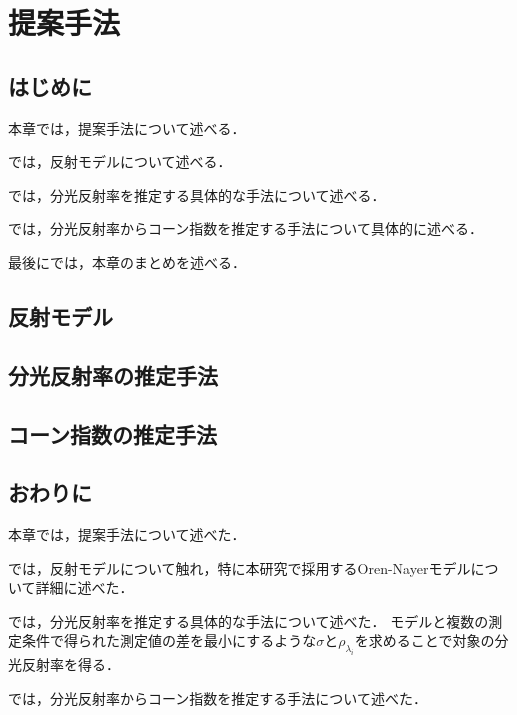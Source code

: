 \documentclass[../main]{subfiles}
\begin{document}
\chapter{提案手法}
\label{cp:proposed_method}
\thispagestyle{empty}
\minitoc
\newpage

\section{はじめに}
\label{sec:pmethod_introduction}

本章では，提案手法について述べる．

では，反射モデルについて述べる．

では，分光反射率を推定する具体的な手法について述べる．

では，分光反射率からコーン指数を推定する手法について具体的に述べる．

最後にでは，本章のまとめを述べる．

\clearpage

\section{反射モデル}
\label{sec:pmethod_model}

\clearpage

\section{分光反射率の推定手法}
\label{sec:pmethod_method}

\clearpage

\section{コーン指数の推定手法}
\label{sec:pmethod_estimation}

\clearpage

\section{おわりに}
\label{sec:pmethod_conclusion}

本章では，提案手法について述べた．

では，反射モデルについて触れ，特に本研究で採用するOren-Nayerモデルについて詳細に述べた．

では，分光反射率を推定する具体的な手法について述べた．
モデルと複数の測定条件で得られた測定値の差を最小にするような$\sigma$と$\rho_{\lambda_i}$を求めることで対象の分光反射率を得る．

では，分光反射率からコーン指数を推定する手法について述べた．

\clearpage
\end{document}
